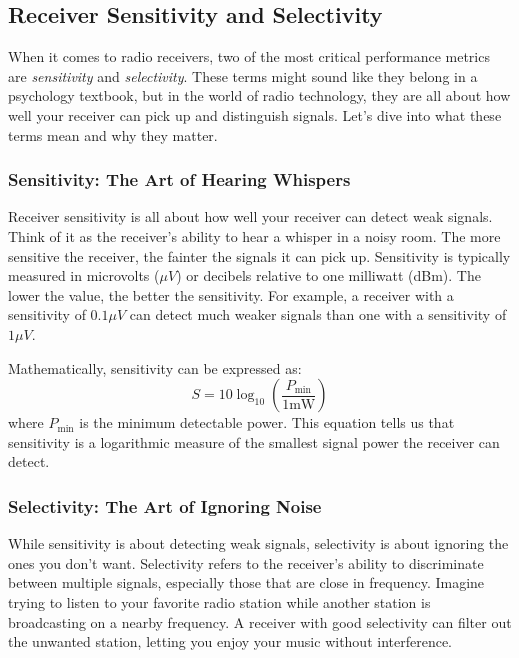 \subsection{Receiver Sensitivity and Selectivity}
\label{subsec:rx-sense-select}

When it comes to radio receivers, two of the most critical performance metrics are \textit{sensitivity} and \textit{selectivity}. These terms might sound like they belong in a psychology textbook, but in the world of radio technology, they are all about how well your receiver can pick up and distinguish signals. Let’s dive into what these terms mean and why they matter.

\subsubsection*{Sensitivity: The Art of Hearing Whispers}
Receiver sensitivity is all about how well your receiver can detect weak signals. Think of it as the receiver’s ability to hear a whisper in a noisy room. The more sensitive the receiver, the fainter the signals it can pick up. Sensitivity is typically measured in microvolts ($\mu V$) or decibels relative to one milliwatt (dBm). The lower the value, the better the sensitivity. For example, a receiver with a sensitivity of $0.1 \mu V$ can detect much weaker signals than one with a sensitivity of $1 \mu V$.

Mathematically, sensitivity can be expressed as:
\begin{equation}
    S = 10 \log_{10} \left( \frac{P_{\text{min}}}{1 \text{mW}} \right)
    \label{eq:sensitivity}
\end{equation}
where $P_{\text{min}}$ is the minimum detectable power. This equation tells us that sensitivity is a logarithmic measure of the smallest signal power the receiver can detect.

\subsubsection*{Selectivity: The Art of Ignoring Noise}
While sensitivity is about detecting weak signals, selectivity is about ignoring the ones you don’t want. Selectivity refers to the receiver’s ability to discriminate between multiple signals, especially those that are close in frequency. Imagine trying to listen to your favorite radio station while another station is broadcasting on a nearby frequency. A receiver with good selectivity can filter out the unwanted station, letting you enjoy your music without interference.

